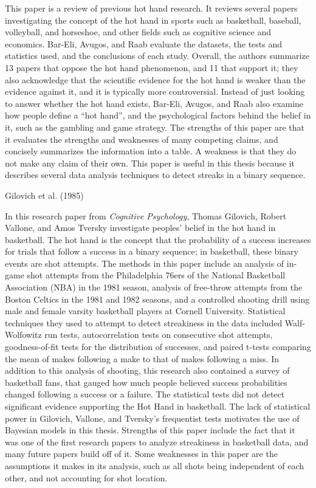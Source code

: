 \documentclass[12pt,twoside]{dukestatscithesis}
\theoremstyle{definition}
\theoremstyle{definition}
\theoremstyle{definition}
\theoremstyle{remark}
\begin{document}
This paper is a review of previous hot hand research. It reviews several
papers investigating the concept of the hot hand in sports such as
basketball, baseball, volleyball, and horseshoe, and other fields such
as cognitive science and economics. Bar-Eli, Avugos, and Raab evaluate
the datasets, the tests and statistics used, and the conclusions of each
study. Overall, the authors summarize 13 papers that oppose the hot hand
phenomenon, and 11 that support it; they also acknowledge that the
scientific evidence for the hot hand is weaker than the evidence against
it, and it is typically more controversial. Instead of just looking to
answer whether the hot hand exists, Bar-Eli, Avugos, and Raab also
examine how people define a ``hot hand'', and the psychological factors
behind the belief in it, such as the gambling and game strategy. The
strengths of this paper are that it evaluates the strengths and
weaknesses of many competing claims, and concisely summarizes the
information into a table. A weakness is that they do not make any claim
of their own. This paper is useful in this thesis because it describes
several data analysis techniques to detect streaks in a binary sequence.

Gilovich et al. (1985)

In this research paper from \emph{Cognitive Psychology}, Thomas
Gilovich, Robert Vallone, and Amos Tversky investigate peoples' belief
in the hot hand in basketball. The hot hand is the concept that the
probability of a success increases for trials that follow a success in a
binary sequence; in basketball, these binary events are shot attempts.
The methods in this paper include an analysis of in-game shot attempts
from the Philadelphia 76ers of the National Basketball Association (NBA)
in the 1981 season, analysis of free-throw attempts from the Boston
Celtics in the 1981 and 1982 seasons, and a controlled shooting drill
using male and female varsity basketball players at Cornell University.
Statistical techniques they used to attempt to detect streakiness in the
data included Walf-Wolfowitz run tests, autocorrelation tests on
consecutive shot attempts, goodness-of-fit tests for the distribution of
successes, and paired t-tests comparing the mean of makes following a
make to that of makes following a miss. In addition to this analysis of
shooting, this research also contained a survey of basketball fans, that
gauged how much people believed success probabilities changed following
a success or a failure. The statistical tests did not detect significant
evidence supporting the Hot Hand in basketball. The lack of statistical
power in Gilovich, Vallone, and Tversky's frequentist tests motivates
the use of Bayesian models in this thesis. Strengths of this paper
include the fact that it was one of the first research papers to analyze
streakiness in basketball data, and many future papers build off of it.
Some weaknesses in this paper are the assumptions it makes in its
analysis, such as all shots being independent of each other, and not
accounting for shot location.
\end{document}
